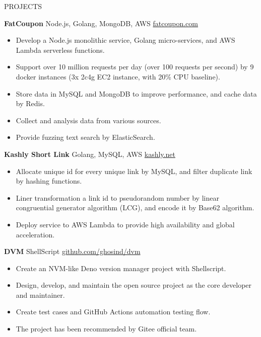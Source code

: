 \documentclass{resume} %
\begin{document}
\begin{rSection}{PROJECTS}
\vspace{-1.25em}

\item \textbf{FatCoupon} {Node.js, Golang, MongoDB, AWS} \hfill \href{https://www.fatcoupon.com}{fatcoupon.com}
\begin{itemize}
  \itemsep -3pt {}
  \item Develop a Node.js monolithic service, Golang micro-services, and AWS Lambda serverless functions.
  \item Support over 10 million requests per day (over 100 requests per second) by 9 docker instances (3x 2c4g EC2 instance, with 20\% CPU baseline).
  \item Store data in MySQL and MongoDB to improve performance, and cache data by Redis.
  \item Collect and analysis data from various sources.
  \item Provide fuzzing text search by ElasticSearch.
\end{itemize}

\item \textbf{Kashly Short Link} {Golang, MySQL, AWS} \hfill \href{https://kashly.net}{kashly.net}
\begin{itemize}
  \itemsep -3pt {}
  \item Allocate unique id for every unique link by MySQL, and filter duplicate link by hashing functions.
  \item Liner transformation a link id to pseudorandom number by linear congruential generator algorithm (LCG), and encode it by Base62 algorithm.
  \item Deploy service to AWS Lambda to provide high availability and global acceleration.
\end{itemize}

\item \textbf{DVM} {ShellScript} \hfill \href{https://github.com/ghosind/dvm}{github.com/ghosind/dvm}
\begin{itemize}
  \itemsep -3pt {}
  \item Create an NVM-like Deno version manager project with Shellscript.
  \item Design, develop, and maintain the open source project as the core developer and maintainer.
  \item Create test cases and GitHub Actions automation testing flow.
  \item The project has been recommended by Gitee official team.
\end{itemize}

\end{rSection}
\end{document}
